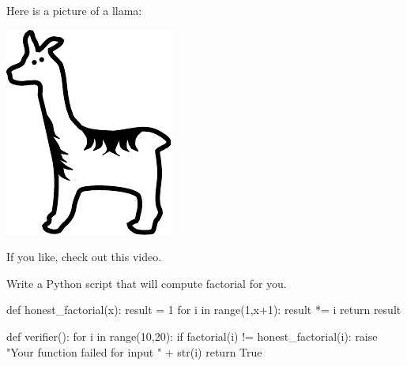 \documentclass{ximera}
\begin{document}
Here is a picture of a llama:
\begin{image}
\includegraphics{llama.pdf}
\end{image}







If you like, check out this video.




\begin{exploration}
Write a Python script that will compute factorial for you.
\begin{solution}
\begin{python}
def honest_factorial(x):
  result = 1
  for i in range(1,x+1):
    result *= i
  return result

def verifier():
  for i in range(10,20):
    if factorial(i) != honest_factorial(i):
      raise "Your function failed for input " + str(i)
  return True
\end{python}
\end{solution}
\end{exploration}
\end{document}
